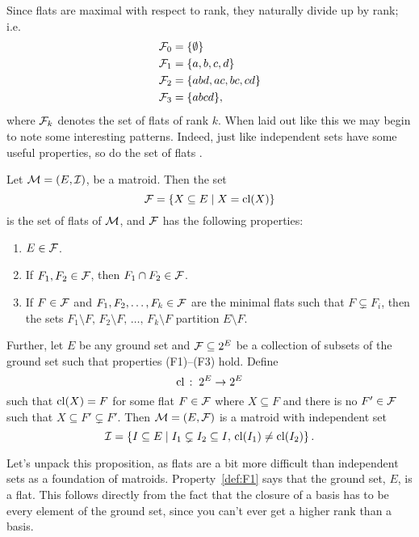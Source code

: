 \documentclass[12pt,oneside]{../../sfsuthesis}
\begin{document}
Since flats are maximal with respect to rank, they naturally divide up by rank; i.e.
\begin{align*}
    \mathcal{F}_0 & = \{ \emptyset \}       \\
    \mathcal{F}_1 & = \{ a, b, c, d \}      \\
    \mathcal{F}_2 & = \{ abd, ac, bc, cd \} \\
    \mathcal{F}_3 & = \{ abcd\},            \\
\end{align*}
where \( \mathcal{F}_k \) denotes the set of flats of rank \( k \).
When laid out like this we may begin to note some interesting patterns.
Indeed, just like independent sets have some useful properties, so do the set of flats \cite[pp.~31-32]{oxleyMatroidTheory2011}.

\begin{proposition}\th\label{prop:matroidFlatAxioms}
    Let \( \mathcal{M} = (E, \mathcal{I}) \), be a matroid.
    Then the set
    \[
        \mathcal{F} = \{ X \subseteq E \; | \; X = \operatorname{cl}(X) \}
    \]
    is the set of flats of \( \mathcal{M} \), and \( \mathcal{F} \) has the following properties:
    \begin{enumerate}[label=(F\arabic*)]
        \item \( E \in \mathcal{F} \).\label{def:F1}
        \item If \(F_1, F_2 \in \mathcal{F}\), then \( F_1 \cap F_2 \in \mathcal{F} \).\label{def:F2}
        \item If \( F \in \mathcal{F} \) and \(F_1, F_2, \dots , F_k \in \mathcal{F} \) are the minimal flats such that \( F \subsetneq F_i \),
              then the sets \( F_1 \setminus F,\, F_2 \setminus F,\, \dots,\, F_k \setminus F \) partition \( E \setminus F \).\label{def:F3}
    \end{enumerate}

    Further, let \( E \) be any ground set and \( \mathcal{F} \subseteq 2^{E} \) be a collection of subsets of the ground set such that properties (F1)--(F3) hold.
    Define
    \[
        \operatorname{cl} \, : \; 2^E \to 2^E
    \]
    such that \( \operatorname{cl}(X) = F \) for some flat \( F \in \mathcal{F} \) where \( X \subseteq F \) and there is no \( F' \in \mathcal{F} \) such that \( X \subseteq F' \subsetneq F' \).
    Then \( \mathcal{M} = (E, \mathcal{F}) \) is a matroid with independent set
    \[
        \mathcal{I} = \left\{ I \subseteq E \; \middle| \; I_1 \subsetneq I_2 \subseteq I, \, \operatorname{cl}(I_1) \neq \operatorname{cl}(I_2)\right\}.
    \]


\end{proposition}

Let's unpack this proposition, as flats are a bit more difficult than independent sets as a foundation of matroids.
Property~\ref{def:F1} says that the ground set, \( E \), is a flat.
This follows directly from the fact that the closure of a basis has to be every element of the ground set, since you can't ever get a higher rank than a basis.
\end{document}
